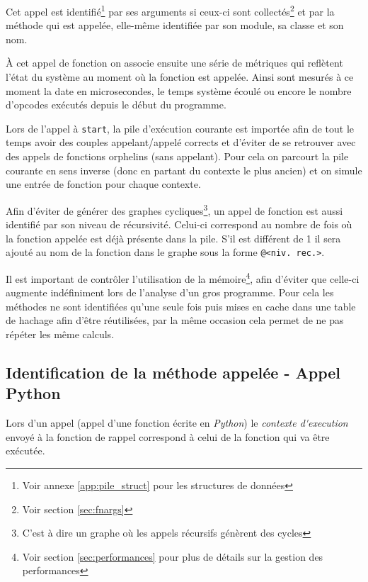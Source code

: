 Cet appel est identifié\footnote{Voir annexe \vref{app:pile_struct} pour les structures de données} par ses arguments si ceux-ci sont collectés\footnote{Voir section \vref{sec:fnargs}} et par la méthode qui est appelée, elle-même identifiée par son module, sa classe et son nom. 

À cet appel de fonction on associe ensuite une série de métriques qui reflètent l'état du système au moment où la fonction est appelée. Ainsi sont mesurés à ce moment la date en microsecondes, le temps système écoulé ou encore le nombre d'opcodes exécutés depuis le début du programme.

\begin{note}
Lors de l'appel à \verb|start|, la pile d'exécution courante est importée afin de tout le temps avoir des couples appelant/appelé corrects et d'éviter de se retrouver avec des appels de fonctions orphelins (sans appelant). Pour cela on parcourt la pile courante en sens inverse (donc en partant du contexte le plus ancien) et on simule une entrée de fonction pour chaque contexte.
\end{note}

\begin{note}
Afin d'éviter de générer des graphes cycliques\footnote{C'est à dire un graphe où les appels récursifs génèrent des cycles}, un appel de fonction est aussi identifié par son niveau de récursivité. Celui-ci correspond au nombre de fois où la fonction appelée est déjà présente dans la pile. S'il est différent de 1 il sera ajouté au nom de la fonction dans le graphe sous la forme \verb|@<niv. rec.>|.
\end{note}

\begin{note}[Performances]
Il est important de contrôler l'utilisation de la mémoire\footnote{Voir section \vref{sec:performances} pour plus de détails sur la gestion des performances}, afin d'éviter que celle-ci augmente indéfiniment lors de l'analyse d'un gros programme. Pour cela les méthodes ne sont identifiées qu'une seule fois puis mises en cache dans une table de hachage afin d'être réutilisées, par la même occasion cela permet de ne pas répéter les même calculs.
\end{note}

\subsection{Identification de la méthode appelée - Appel Python}
\label{ident-python}
Lors d'un appel \Python (appel d'une fonction écrite en \emph{Python}) le \emph{\gls{contexte d'execution}} envoyé à la fonction de rappel correspond à celui de la fonction qui va être exécutée.

